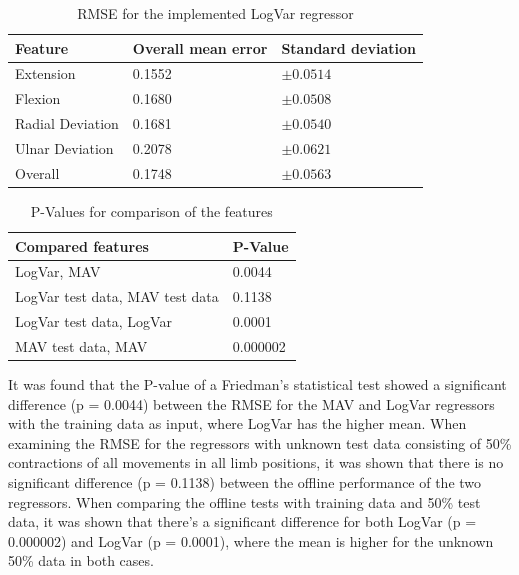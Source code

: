 	\begin{table}[!thpb]
		\begin{center}
			\begin{tabular}{l l l}
				\hline
				\textbf{Feature} & \textbf{Overall mean error} & \textbf{Standard deviation}\\
				\hline
				Extension & 0.1552 & $\pm 0.0514$ \\
				Flexion & 0.1680 & $\pm 0.0508$ \\
				Radial Deviation & 0.1681 & $\pm 0.0540$ \\
				Ulnar Deviation & 0.2078 & $\pm 0.0621$ \\
				Overall & 0.1748 & $\pm 0.0563$ \\
				\hline
			\end{tabular}
			\caption{RMSE for the implemented LogVar regressor}
		\end{center}
	\end{table}
	
	\begin{table}[!thpb]
		\begin{center}
			\begin{tabular}{l l}
				\hline
				\textbf{Compared features} & \textbf{P-Value}\\
				\hline
				LogVar, MAV & 0.0044 \\
				LogVar test data, MAV test data & 0.1138 \\
				LogVar test data, LogVar & 0.0001 \\
				MAV test data, MAV & 0.000002 \\
				\hline
			\end{tabular}
			\caption{P-Values for comparison of the features}
		\end{center}
	\end{table}
	It was found that the P-value of a Friedman's statistical test showed a significant difference (p = 0.0044) between the RMSE for the MAV and LogVar regressors with the training data as input, where LogVar has the higher mean. When examining the RMSE for the regressors with unknown test data consisting of 50\% contractions of all movements in all limb positions, it was shown that there is no significant difference (p = 0.1138) between the offline performance of the two regressors. When comparing the offline tests with training data and 50\% test data, it was shown that there's a significant difference for both LogVar (p = 0.000002) and LogVar (p = 0.0001), where the mean is higher for the unknown 50\% data in both cases.
	
